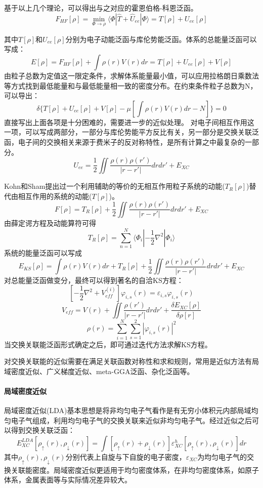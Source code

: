 基于以上几个理论，可以得出与之对应的霍恩伯格-科恩泛函。
$$F_{HF}[\rho]=\min_{\Phi \to \rho} \langle {\Phi} |\hat{T}+\hat{U}_{ee}|\Phi \rangle =T[\rho]+U_{ee}[\rho]   $$

其中$T[\rho]$和$U_{ee}[\rho]$分别为电子动能泛函与库伦势能泛函。体系的总能量泛函可以写成：
$$E[\rho]=F_{HF}[\rho]+\int \rho(r)V(r)dr=T[\rho]+U_{ee}[\rho]+V[\rho]$$
由粒子总数为定值这一限定条件，求解体系能量最小值，可以应用拉格朗日乘数法等方式找到最低能量和与最低能量相一致的密度分布。在约束条件粒子总数为N，可以导出：
$$\delta\{T[\rho]+U_{ee}[\rho]+V[\rho] - \mu[\int \rho(r)V(r)dr-N]   \} =0$$
直接写出上面各项是十分困难的，需要进一步的近似处理。\cite{becke1992density}
对电子间相互作用这一项，可以写成两部分，一部分与库伦势能平方反比有关，另一部分是交换关联泛函，电子间的交换相关来源于费米子的反对称特性，是所有计算之中最复杂的一部分。
$$ U_{ee} = \frac{1}{2} \iint \frac{\rho (r) \rho (r') }{|r-r'|} drdr'+E_{XC}$$

Kohn和Sham提出过一个利用辅助的等价的无相互作用粒子系统的动能($T_{R}[\rho]$)替代由相互作用的系统的动能($T[\rho]$)。
$$F[\rho]=T_{R}[\rho]+\frac{1}{2} \iint \frac{\rho (r) \rho (r') }{|r-r'|} drdr'+E_{XC}$$
由薛定谔方程及动能算符可得
$$T_{R}[\rho]=\sum_{n = 1}^{N}\langle \Phi_{i} | -\frac{1}{2} \nabla^{2}| \Phi_{i} \rangle   $$
系统的能量泛函可以写成
$$E_{KS}[\rho]=\int \rho(r)V(r)dr+T_{R}[\rho]+\frac{1}{2} \iint \frac{\rho (r) \rho (r') }{|r-r'|} drdr'+E_{XC}$$
对总能量泛函做变分，最终可以得到著名的自洽KS方程\cite{kohn1965self}：
$$[-\frac{1}{2} \nabla^{2}+V_{eff}^{(i)}]\varphi_{i,s}(r)= \varepsilon _{i,s}\varphi_{i,s}(r)$$
$$V_{eff}=V(r)+\iint \frac{ \rho (r') }{|r-r'|} drdr'+\frac{\delta E_{XC}[\rho]}{\delta \rho[r]}$$
$$\rho(r)=\sum_{i = 1}^{N} \sum_{s = 1}^{2}|\varphi_{i,s}(r)|^{2}   $$
当交换关联能泛函形式确定之后，即可通过迭代方法求解KS方程。

对交换关联能的近似需要在满足关联函数对称性和求和规则，常用是近似方法有局域密度近似、广义梯度近似、meta-GGA泛函、杂化泛函等。
\paragraph{局域密度近似}局域密度近似(LDA)基本思想是将非均匀电子气看作是有无穷小体积元内部局域均匀电子气组成，利用均匀电子气的交换关联来近似非均匀电子气。经过近似之后可以得到交换关联泛函：
$$E_{XC}^{LDA}[\rho_{\uparrow}(r),\rho_{\downarrow}(r)]=\int [\rho_{\uparrow }(r)+\rho_{\downarrow}(r)]\varepsilon _{XC}^{h}[\rho_{\uparrow}(r),\rho_{\downarrow}(r)]dr$$
其中$\rho_{\uparrow}(r),\rho_{\downarrow}(r)$分别代表上自旋与下自旋的电子密度，$\varepsilon _{XC}$为均匀电子气的交换关联能密度。局域密度近似更适用于均匀密度体系，在非均匀密度体系，如原子体系，金属表面等与实际情况差异较大。\cite{黄美纯2000密度泛函理论的若干进展}
